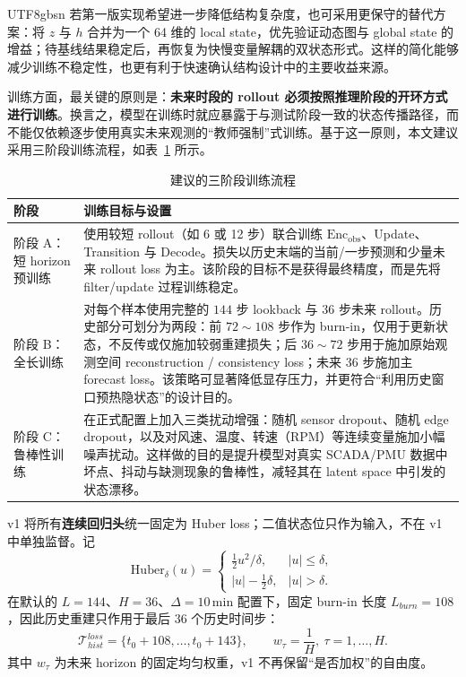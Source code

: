 \documentclass[11pt]{article}
\begin{document}
\begin{CJK}{UTF8}{gbsn}
若第一版实现希望进一步降低结构复杂度，也可采用更保守的替代方案：将 \(z\) 与 \(h\) 合并为一个 64 维的 local state，优先验证动态图与 global state 的增益；待基线结果稳定后，再恢复为快慢变量解耦的双状态形式。这样的简化能够减少训练不稳定性，也更有利于快速确认结构设计中的主要收益来源。

训练方面，最关键的原则是：\textbf{未来时段的 rollout 必须按照推理阶段的开环方式进行训练}。换言之，模型在训练时就应暴露于与测试阶段一致的状态传播路径，而不能仅依赖逐步使用真实未来观测的“教师强制”式训练。基于这一原则，本文建议采用三阶段训练流程，如表~\ref{tab:training_stages} 所示。

\begin{table}[!ht]
\centering
\caption{建议的三阶段训练流程}
\label{tab:training_stages}
\renewcommand{\arraystretch}{1.15}
\begin{tabularx}{0.96\linewidth}{@{}lX@{}}
\hline
\textbf{阶段} & \textbf{训练目标与设置} \\
\hline
阶段 A：短 horizon 预训练 &
使用较短 rollout（如 6 或 12 步）联合训练 \(\mathrm{Enc}_{\mathrm{obs}}\)、Update、Transition 与 Decode。损失以历史末端的当前/一步预测和少量未来 rollout loss 为主。该阶段的目标不是获得最终精度，而是先将 filter/update 过程训练稳定。 \\
\hline
阶段 B：全长训练 &
对每个样本使用完整的 \(144\) 步 lookback 与 \(36\) 步未来 rollout。历史部分可划分为两段：前 \(72\sim108\) 步作为 burn-in，仅用于更新状态，不反传或仅施加较弱重建损失；后 \(36\sim72\) 步用于施加原始观测空间 reconstruction / consistency loss；未来 \(36\) 步施加主 forecast loss。该策略可显著降低显存压力，并更符合“利用历史窗口预热隐状态”的设计目的。 \\
\hline
阶段 C：鲁棒性训练 &
在正式配置上加入三类扰动增强：随机 sensor dropout、随机 edge dropout，以及对风速、温度、转速（RPM）等连续变量施加小幅噪声扰动。这样做的目的是提升模型对真实 SCADA/PMU 数据中坏点、抖动与缺测现象的鲁棒性，减轻其在 latent space 中引发的状态漂移。 \\
\hline
\end{tabularx}
\end{table}

v1 将所有\textbf{连续回归头}统一固定为 Huber loss；二值状态位只作为输入，不在 v1 中单独监督。记
\[
\mathrm{Huber}_{\delta}(u)=
\begin{cases}
\frac{1}{2}u^2/\delta, & |u|\le \delta,\\
|u|-\frac{1}{2}\delta, & |u|>\delta.
\end{cases}
\]
在默认的 $L=144$、$H=36$、$\Delta=10\,\mathrm{min}$ 配置下，固定 burn-in 长度 $L_{burn}=108$，因此历史重建只作用于最后 $36$ 个历史时间步：
\[
\mathcal T_{hist}^{loss}=\{t_0+108,\ldots,t_0+143\},\qquad w_\tau=\frac{1}{H},\ \tau=1,\ldots,H.
\]
其中 $w_\tau$ 为未来 horizon 的固定均匀权重，v1 不再保留“是否加权”的自由度。


\end{CJK}
\end{document}

